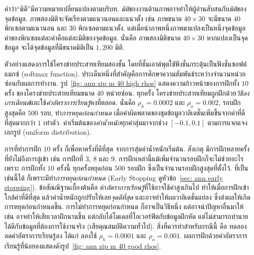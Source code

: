 {\small
\begin{shaded}
คำว่า``มิติ''มีความหมายเปลี่ยนแปลงตามบริบท.
\textit{มิติ}ของงานด้านภาพอาจทำให้ผู้อ่านสับสนกับ\textit{มิติ}ของจุดข้อมูล.
ภาพสองมิติจะจัดเรียงตามแนวนอนและแนวตั้ง เช่น ภาพขนาด $40 \times 30$ จะมีขนาด $40$ พิกเซลตามแนวนอน และ $30$ พิกเซลตามแนวตั้ง.
แต่เมื่อนำภาพหนึ่งภาพมาแปลงเป็นหนึ่งจุดข้อมูล ค่าของพิกเซลแต่ละค่าคือแต่ละมิติของจุดข้อมูล.
นั่นคือ ภาพสองมิติขนาด $40 \times 30$ หากแปลงเป็นจุดข้อมูล จะได้จุดข้อมูลที่มีขนาดมิติเป็น $1,200$ มิติ.
\end{shaded}
}%

ตัวอย่างแสดงการใช้โครงข่ายประสาทเทียมสองชั้น 
โดยที่ชั้นเอาต์พุตใช้ฟังชั่นกระตุ้นเป็นฟังชั่นซอฟต์แมกซ์ (softmax function).
ประเด็นหนึ่งที่สำคัญคือการศึกษาความสัมพันธ์ระหว่างจำนวนหน่วยซ่อนกับผลการทำงาน.
%
รูป~\ref{fig: ann zip m 40 high rhos} แสดงความก้าวหน้าของการฝึกทั้ง $10$ ครั้ง
ของโครงข่ายประสาทเทียมขนาด $40$ หน่วยซ่อน. 
ทุกครั้ง โครงข่ายประสาทเทียมถูกฝึกด้วย\textit{วิธีลงเกรเดียนต์}และใช้\textit{ค่าอัตราการเรียนรู้}คงที่ตลอด.
นั่นคือ $\rho_h = 0.0002$ และ $\rho_o=0.002$, รอบฝึกสูงสุดคือ $500$ รอบ, 
ทำ\textit{การหยุดก่อนกำหนด} เมื่อค่าผิดพลาดของชุดข้อมูลวาลิเดชั่นเพิ่มขึ้นจากค่าที่ดีที่สุดมากกว่า $1$ เท่าตัว.
ค่าเริ่มต้นของ\textit{ค่าน้ำหนัก}ทุกค่าสุ่มมาจากช่วง $[-0.1,0.1]$ ตามการแจกแจงเอกรูป (uniform distribution).

การที่ทำการฝึก $10$ ครั้ง ก็เพื่อหาครั้งที่ดีที่สุด จากการสุ่มค่าน้ำหนักเริ่มต้น.
สังเกตุ มีการฝึกหลายครั้งที่ยังไม่ถึงการลู่เข้า เช่น การฝึกที่ 3, 8 และ 9.
การฝึกเหล่านี้แม้เพิ่มจำนวนรอบฝึกก็จะไม่ช่วยอะไร 
เพราะ การฝึกทั้ง $10$ ครั้งนี้ ทุกครั้งหยุดก่อน $500$ รอบฝึก ซึ่งเป็นจำนวนรอบฝึกสูงสุดที่ตั้งไว้.
ที่เป็นเช่นนี้ได้ ก็เพราะมีทำ\textit{การหยุดก่อนกำหนด} (Early Stopping ดูหัวข้อ~\ref{sec: ann early stopping}).
ข้อสัณณิฐานเบื้องต้นคือ ค่า\textit{อัตราการเรียนรู้}ที่ใช้อาจใช้ค่าสูงเกินไป 
ทำให้เมื่อการฝึกเข้าใกล้ค่าที่ดีที่สุด แล้วค่าน้ำหนักถูกปรับให้เลย\textit{จุดดีที่สุด} 
และอาจทำให้ผลวาลิเดชั่นแย่ลง ซึ่งส่งผลให้เกิดการหยุดก่อนกำหนดขึ้น.
การไม่ทำการหยุดก่อนกำหนด ก็อาจเป็นวิธีหนึ่ง แต่อาจนำปัญหาอื่นมาให้ 
เช่น อาจทำให้เสียเวลาฝึกนานขึ้น แต่กลับได้โมเดลที่โอเวอร์ฟิตกับข้อมูลฝึกหัด แต่ไม่สามารถทำนายได้ดีกับข้อมูลที่ต้องการใช้งานจริง (เสียคุณสมบัติความทั่วไป).
สิ่งที่ควรทำสำหรับกรณีนี้ คือ ทดลองลดค่าอัตราการเรียนรู้ลง ได้แก่ ลองใช้ $\rho_h=0.0001$ และ $\rho_o=0.001$.
ผลการฝึกด้วยค่าอัตราการเรียนรู้ที่น้อยลงแสดงดังรูป~\ref{fig: ann zip m 40 good rhos}.

